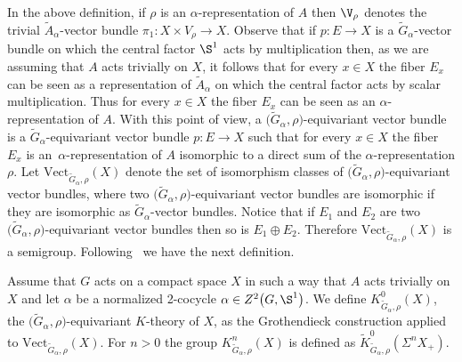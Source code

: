 In the above definition, if $\rho$ is an $\alpha$-representation of $A$ then $\V_{\rho}$
denotes the trivial $\widetilde{A}_{\alpha}$-vector bundle $\pi_{1}\colon X\times V_{\rho}\to X$.
Observe that if $p\colon E\to X$ is a $\widetilde{G}_{\alpha}$-vector bundle on which the central
factor $\S^{1}$ acts by multiplication then, as we are assuming that $A$ acts trivially
on $X$, it follows that for every $x \in X$ the fiber $E_{x}$ can be seen as a representation of
$\widetilde{A}_{\alpha}$ on which the central factor acts by scalar multiplication. Thus for every
$x \in X$ the fiber $E_{x}$ can be seen as an $\alpha$-representation of $A$.
With this point of view, a $\big(\widetilde{G}_{\alpha}, \rho\big)$-equivariant vector bundle is a
$\widetilde{G}_\alpha$-equivariant vector bundle $p\colon E\rightarrow X$ such that for every
$x \in X$ the fiber $E_{x}$ is an~$\alpha$-representation of $A$ isomorphic to a direct sum of
the $\alpha$-representation $\rho$. Let $\text{Vect}_{\widetilde{G}_{\alpha}, \rho}(X)$
denote the set of isomorphism classes of $\big(\widetilde{G}_{\alpha}, \rho\big)$-equivariant vector
bundles, where two $\big(\widetilde{G}_{\alpha}, \rho\big)$-equivariant vector bundles are isomorphic
if they are isomorphic as $\widetilde{G}_{\alpha}$-vector bundles. Notice that if
$E_{1}$ and $E_{2}$ are two $\big(\widetilde{G}_{\alpha}, \rho\big)$-equivariant vector bundles
then so is $E_{1}\oplus E_{2}$. Therefore $\text{Vect}_{\widetilde{G}_{\alpha}, \rho}(X)$
is a semigroup. Following~\cite[Definition~2.2]{GomezUribe} we have the next definition.

\begin{Def}\label{def,grhoalfa}
Assume that $G$ acts on a compact space $X$ in such a way that $A$ acts trivially on $X$
and let $\alpha$ be a normalized 2-cocycle $\alpha\in Z^{2}\big(G,\S^{1}\big)$. We define
$K^{0}_{\widetilde{G}_{\alpha}, \rho}(X)$, the $\big(\widetilde{G}_{\alpha}, \rho\big)$-equivariant
$K$-theory of $X$, as the Grothendieck construction applied to
$\text{Vect}_{\widetilde{G}_{\alpha}, \rho}(X)$. For $n>0$ the group
$K^{n}_{\widetilde{G}_{\alpha}, \rho}(X)$ is defined as
$\tilde{K}^{0}_{\widetilde{G}_{\alpha}, \rho}(\Sigma^{n}X_{+})$.
\end{Def}

